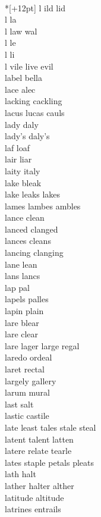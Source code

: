 \vspace{14pt}
\noindent\notextbf{\LargeL}\\*[+12pt]
l ild lid  \\
l la \\
l law wal  \\
l le \\
l li \\
l vile live evil   \\
label bella\\
lace alec\\
lacking cackling \\
lacus lucas cauls\\
lady daly\\
lady's daly's\\
laf loaf \\
lair liar\\
laity italy\\
lake bleak \\
lake leaks lakes \\
lames lambes ambles \\
lance clean\\
lanced clanged \\
lances cleans\\
lancing clanging \\
lane lean\\
lans lancs \\
lap pal\\
lapels palles\\
lapin plain\\
lare blear \\
lare clear \\
lare lager large regal \\
laredo ordeal\\
laret rectal \\
largely gallery\\
larum mural\\
last salt\\
lastic castile \\
late least tales stale steal \\
latent talent latten\\
latere relate tearle\\
lates staple petals pleats \\
lath halt\\
lather halter alther\\
latitude altitude\\
latrines entrails\\
